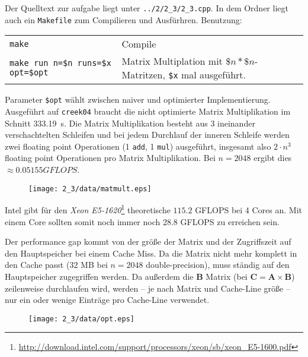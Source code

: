 \documentclass[a4paper,11pt]{scrartcl}
\begin{document}
Der Quelltext zur aufgabe liegt unter \verb+../2/2_3/2_3.cpp+. In dem Ordner liegt auch ein \verb+Makefile+ zum Compilieren und Ausfürhren. Benutzung: 

\begin{table}[!ht]
    \begin{tabular}{ll}
    \verb+make+& Compile \\ 
    \verb+make run n=$n runs=$x opt=$opt+ & Matrix Multiplation mit $\$n*\$n$-Matritzen, \verb+$x+ mal ausgeführt. \\
    \end{tabular}
\end{table}
Parameter \verb+$opt+ wählt zwischen naiver und optimierter Implementierung.\\

Ausgeführt auf \verb+creek04+ braucht die nicht optimierte Matrix Multiplikation im Schnitt \SI{333.19}{\second}. Die Matrix Multiplikation besteht aus 3 ineinander verschachtelten Schleifen und bei jedem Durchlauf der inneren Schleife werden zwei floating point Operationen (1 \verb+add+, 1 \verb+mul+) ausgeführt, insgesamt also $2\cdot n^3$ floating point Operationen pro Matrix Multiplikation. Bei $n=2048$ ergibt dies $\approx 0.05155 GFLOPS$. 

\begin{figure}[!ht]
    \centering
    \texttt{[image: 2\_3/data/matmult.eps]}
\end{figure}

Intel gibt für den \emph{Xeon E5-1620}\footnote{\url{http://download.intel.com/support/processors/xeon/sb/xeon_E5-1600.pdf}} theoretische $115.2$ GFLOPS bei 4 Cores an. Mit einem Core sollten somit noch immer noch $28.8$ GFLOPS zu erreichen sein.

Der performance gap kommt von der größe der Matrix und der Zugriffszeit auf den Hauptspeicher bei einem Cache Miss. Da die Matrix nicht mehr komplett in den Cache passt (32 MB bei $n=2048$ double-precision), muss ständig auf den Hauptspeicher zugegriffen werden. Da außerdem die $\mathbf{B}$ Matrix (bei $\mathbf{C}=\mathbf{A}\times \mathbf{B}$) zeilenweise durchlaufen wird, werden -- je nach Matrix und Cache-Line größe -- nur ein oder wenige Einträge pro Cache-Line verwendet. \\


\begin{figure}[!ht]
    \centering
    \texttt{[image: 2\_3/data/opt.eps]}
\end{figure}
\end{document}
